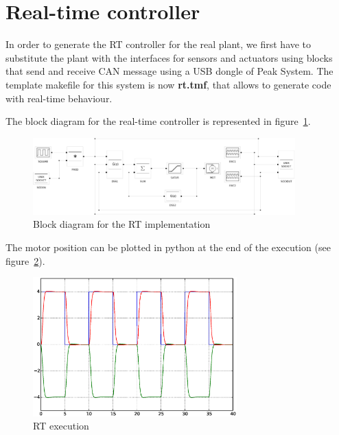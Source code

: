 \section{Real-time controller}

In order to generate the RT controller for the real plant, we first have to 
substitute the plant with the interfaces for sensors and actuators using blocks 
that send and receive CAN message using a USB dongle of Peak System. The 
template makefile for this system is now \textbf{rt.tmf}, that allows to 
generate code with real-time behaviour.

The block diagram for the real-time controller is represented in 
figure~\ref{F23}.

\begin{figure}[htbp]	%
\centering
\includegraphics[width=0.9\textwidth]{eps/disksrt.eps}
\caption{Block diagram for the RT implementation}
\label{F23}
\end{figure}

The motor position can be plotted in python at the end of the execution (see 
figure~\ref{F24}).

\begin{figure}[htbp]	%
\centering
\includegraphics[width=0.7\textwidth]{eps/rtout.eps}
\caption{RT execution}
\label{F24}
\end{figure}
